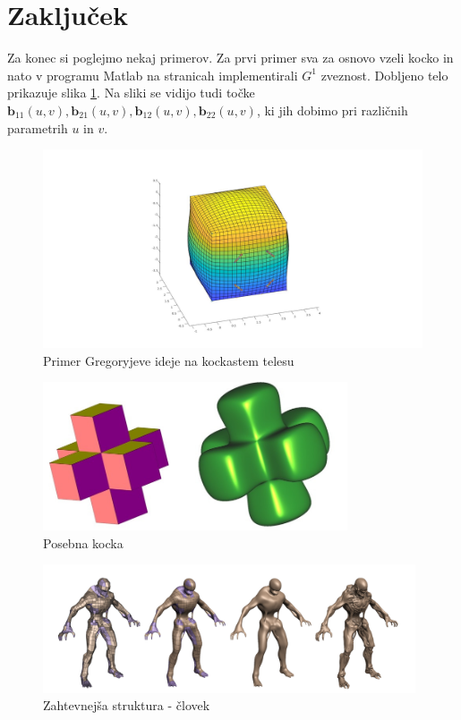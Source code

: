 \documentclass[a4paper,regno]{article}
\newcommand{\tbf}{\textbf}
\begin{document}
\section{Zaključek}
Za konec si poglejmo nekaj primerov. Za prvi primer  sva za osnovo vzeli kocko in nato v programu Matlab na stranicah implementirali $G^1$ zveznost. Dobljeno telo prikazuje slika \ref{fig:g_kocka}. Na sliki se vidijo tudi točke $\tbf{b}_{11}(u,v),
\tbf{b}_{21}(u,v), \tbf{b}_{12}(u,v), \tbf{b}_{22}(u,v)$, ki jih dobimo pri različnih parametrih $u$ in $v$.
\begin{figure}[h]
	\centering
	\includegraphics[width=15cm]{gregory_kocka.jpg}
	\caption{Primer Gregoryjeve ideje na kockastem telesu}
	\label{fig:g_kocka}
\end{figure}

\begin{figure}[h]
	\centering
	\includegraphics[width=9cm]{posebna_kocka.jpg}
	\caption{Posebna kocka}
\end{figure}

\begin{figure}[H]
	\centering
	\includegraphics[width=11cm]{koncni_primer.png}
	\caption{Zahtevnejša struktura - človek}
	\label{človek}
\end{figure}
\end{document}
